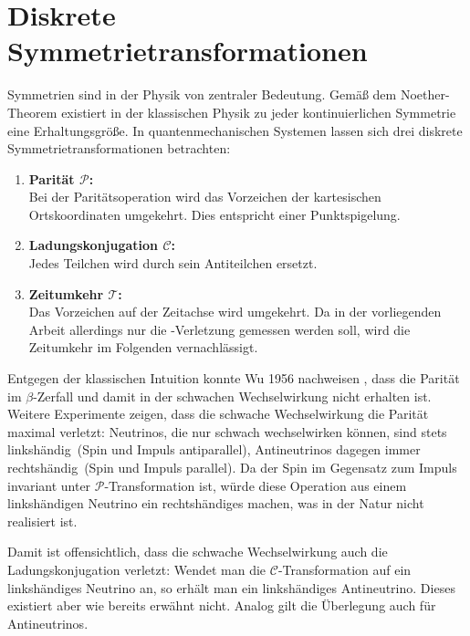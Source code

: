 \section{Diskrete Symmetrietransformationen}
Symmetrien sind in der Physik von zentraler Bedeutung. Gemäß dem Noether-Theorem existiert in der klassischen Physik zu jeder kontinuierlichen Symmetrie eine Erhaltungsgröße. In quantenmechanischen Systemen lassen sich drei diskrete Symmetrietransformationen betrachten:
\begin{enumerate}
\boldmath
\item \textbf{Parität $\mathcal{P}$:} \\
      Bei der Paritätsoperation wird das Vorzeichen der kartesischen Ortskoordinaten umgekehrt. Dies entspricht einer Punktspigelung.
\item \textbf{Ladungskonjugation $\mathcal{C}$:} \\
      Jedes Teilchen wird durch sein Antiteilchen ersetzt.
\item \textbf{Zeitumkehr $\mathcal{T}$:} \\
      Das Vorzeichen auf der Zeitachse wird umgekehrt. Da in der vorliegenden Arbeit allerdings nur die \CP-Verletzung gemessen werden soll, wird die Zeitumkehr im Folgenden vernachlässigt.
\unboldmath
\end{enumerate}
Entgegen der klassischen Intuition konnte Wu 1956 nachweisen \cite{wu-experiment}, dass die Parität im $\beta$-Zerfall und damit in der schwachen Wechselwirkung nicht erhalten ist. Weitere Experimente zeigen, dass die schwache Wechselwirkung die Parität maximal verletzt: Neutrinos, die nur schwach wechselwirken können, sind stets \glqq linkshändig\grqq\ (Spin und Impuls antiparallel), Antineutrinos dagegen immer \glqq rechtshändig\grqq\ (Spin und Impuls parallel). Da der Spin im Gegensatz zum Impuls invariant unter $\mathcal{P}$-Transformation ist, würde diese Operation aus einem linkshändigen Neutrino ein rechtshändiges machen, was in der Natur nicht realisiert ist.

Damit ist offensichtlich, dass die schwache Wechselwirkung auch die Ladungskonjugation verletzt: Wendet man die $\mathcal{C}$-Transformation auf ein linkshändiges Neutrino an, so erhält man ein linkshändiges Antineutrino. Dieses existiert aber wie bereits erwähnt nicht. Analog gilt die Überlegung auch für Antineutrinos.


